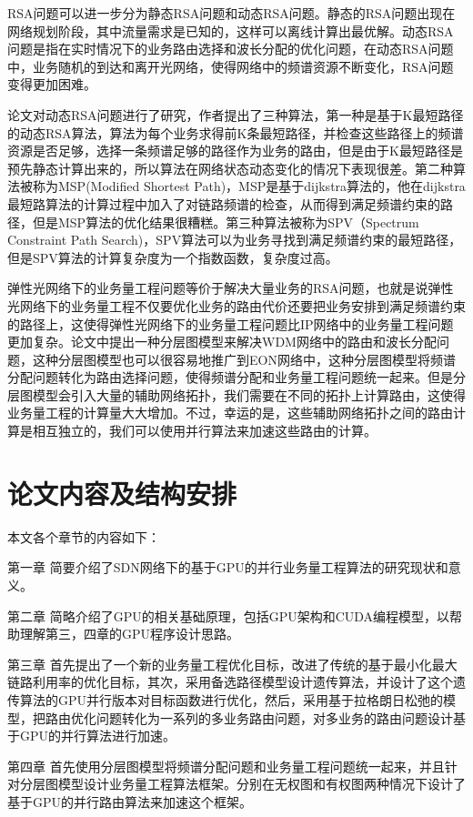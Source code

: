 \documentclass[master]{thesis-uestc}
\begin{document}
RSA问题可以进一步分为静态RSA问题和动态RSA问题。静态的RSA问题出现在网络规划阶段，其中流量需求是已知的，这样可以离线计算出最优解。动态RSA问题是指在实时情况下的业务路由选择和波长分配的优化问题，在动态RSA问题中，业务随机的到达和离开光网络，使得网络中的频谱资源不断变化，RSA问题变得更加困难。

论文对动态RSA问题进行了研究，作者提出了三种算法，第一种是基于K最短路径的动态RSA算法，算法为每个业务求得前K条最短路径，并检查这些路径上的频谱资源是否足够，选择一条频谱足够的路径作为业务的路由，但是由于K最短路径是预先静态计算出来的，所以算法在网络状态动态变化的情况下表现很差。第二种算法被称为MSP(Modified Shortest Path)，MSP是基于dijkstra算法的，他在dijkstra最短路算法的计算过程中加入了对链路频谱的检查，从而得到满足频谱约束的路径，但是MSP算法的优化结果很糟糕。第三种算法被称为SPV（Spectrum Constraint Path Search)，SPV算法可以为业务寻找到满足频谱约束的最短路径，但是SPV算法的计算复杂度为一个指数函数，复杂度过高。

弹性光网络下的业务量工程问题等价于解决大量业务的RSA问题，也就是说弹性光网络下的业务量工程不仅要优化业务的路由代价还要把业务安排到满足频谱约束的路径上，这使得弹性光网络下的业务量工程问题比IP网络中的业务量工程问题更加复杂。论文中提出一种分层图模型来解决WDM网络中的路由和波长分配问题，这种分层图模型也可以很容易地推广到EON网络中，这种分层图模型将频谱分配问题转化为路由选择问题，使得频谱分配和业务量工程问题统一起来。但是分层图模型会引入大量的辅助网络拓扑，我们需要在不同的拓扑上计算路由，这使得业务量工程的计算量大大增加。不过，幸运的是，这些辅助网络拓扑之间的路由计算是相互独立的，我们可以使用并行算法来加速这些路由的计算。

\section{论文内容及结构安排}
本文各个章节的内容如下：

第一章 简要介绍了SDN网络下的基于GPU的并行业务量工程算法的研究现状和意义。

第二章 简略介绍了GPU的相关基础原理，包括GPU架构和CUDA编程模型，以帮助理解第三，四章的GPU程序设计思路。

第三章 首先提出了一个新的业务量工程优化目标，改进了传统的基于最小化最大链路利用率的优化目标，其次，采用备选路径模型设计遗传算法，并设计了这个遗传算法的GPU并行版本对目标函数进行优化，然后，采用基于拉格朗日松弛的模型，把路由优化问题转化为一系列的多业务路由问题，对多业务的路由问题设计基于GPU的并行算法进行加速。

第四章 首先使用分层图模型将频谱分配问题和业务量工程问题统一起来，并且针对分层图模型设计业务量工程算法框架。分别在无权图和有权图两种情况下设计了基于GPU的并行路由算法来加速这个框架。



\end{document}
